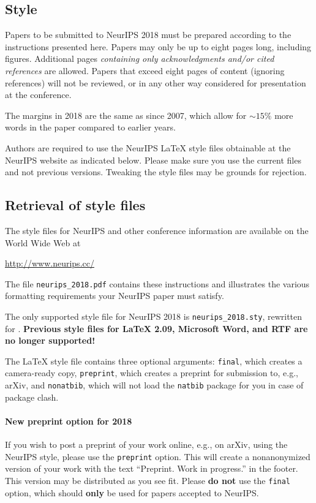 \documentclass{article}
\begin{document}
\subsection{Style}

Papers to be submitted to NeurIPS 2018 must be prepared according to the
instructions presented here. Papers may only be up to eight pages long,
including figures. Additional pages \emph{containing only acknowledgments and/or
  cited references} are allowed. Papers that exceed eight pages of content
(ignoring references) will not be reviewed, or in any other way considered for
presentation at the conference.

The margins in 2018 are the same as since 2007, which allow for $\sim$$15\%$
more words in the paper compared to earlier years.

Authors are required to use the NeurIPS \LaTeX{} style files obtainable at the
NeurIPS website as indicated below. Please make sure you use the current files
and not previous versions. Tweaking the style files may be grounds for
rejection.

\subsection{Retrieval of style files}

The style files for NeurIPS and other conference information are available on
the World Wide Web at
\begin{center}
  \url{http://www.neurips.cc/}
\end{center}
The file \verb+neurips_2018.pdf+ contains these instructions and illustrates the
various formatting requirements your NeurIPS paper must satisfy.

The only supported style file for NeurIPS 2018 is \verb+neurips_2018.sty+,
rewritten for \LaTeXe{}.  \textbf{Previous style files for \LaTeX{} 2.09,
  Microsoft Word, and RTF are no longer supported!}

The \LaTeX{} style file contains three optional arguments: \verb+final+, which
creates a camera-ready copy, \verb+preprint+, which creates a preprint for
submission to, e.g., arXiv, and \verb+nonatbib+, which will not load the
\verb+natbib+ package for you in case of package clash.

\paragraph{New preprint option for 2018}
If you wish to post a preprint of your work online, e.g., on arXiv, using the
NeurIPS style, please use the \verb+preprint+ option. This will create a
nonanonymized version of your work with the text ``Preprint. Work in progress.''
in the footer. This version may be distributed as you see fit. Please \textbf{do
  not} use the \verb+final+ option, which should \textbf{only} be used for
papers accepted to NeurIPS.
\end{document}
